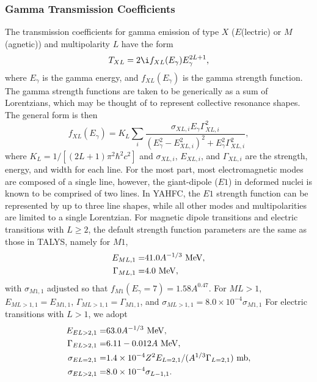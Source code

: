 \documentclass[
10pt,
showpacs,preprintnumbers,footinbib,
amsfonts,amsmath,amssymb,
aps,
prc,twocolumn,groupedaddress,superscriptaddress,
showkeys,
nofootinbib
]{revtex4-1}
\begin{document}
\subsubsection{Gamma Transmission Coefficients}

The transmission coefficients for gamma emission of type $X$ ($E$(lectric) or $M$(agnetic)) and multipolarity $L$ have the form
\begin{equation}
T_{XL} = 2\i f_{XL}(E_\gamma)E_\gamma^{2L+1},
\end{equation}
where $E_\gamma$ is the gamma energy, and $f_{XL}(E_\gamma)$ is the gamma strength function. The gamma strength functions are taken to be generically as a sum of Lorentzians, which may be thought of to represent collective resonance shapes. The general form is then
\begin{equation}
f_{XL}(E_\gamma ) = K_L \sum_i \frac{\sigma_{XL,i} E_\gamma\Gamma^2_{XL,i}}{(E_\gamma^2 - E^2_{XL,i})^2+E^2_\gamma\Gamma^2_{XL,i}},
\label{eq:Lor}
\end{equation} 
where $K_L = 1/[(2L+1)\pi^2\hbar^2c^2]$ and $\sigma_{XL,i}$, $E_{XL,i}$, and $\Gamma_{XL,i}$ are the strength, energy, and width for each line. For the most part, most electromagnetic modes are composed of a single line, however, the giant-dipole ($E1$) in deformed nuclei is known to be comprised of two lines. In YAHFC, the $E1$ strength function can be represented by up to three line shapes, while all other modes and multipolarities are limited to a single Lorentzian. For magnetic dipole transitions and electric transitions with $L \ge 2$, the default strength function parameters are the same as those in TALYS, namely for $M1$,
\begin{align}
E_{ML,1} =  & 41.0A^{-1/3}~{\rm MeV},\notag\\
\Gamma_{ML,1} = & 4.0~{\rm MeV},
\end{align}
with $\sigma_{M1,1}$ adjusted so that $f_{M1}(E_\gamma = 7) = 1.58A^{0.47}$. For $ML>1$, $E_{ML>1,1} = E_{M1,1}$, $\Gamma_{ML>1,1} = \Gamma_{M1,1}$, and $\sigma_{ML>1,1} = 8.0\times 10^{-4}\sigma_{M1,1}$
 For electric transitions with $L > 1$, we adopt
\begin{align}
E_{EL>2,1} =  & 63.0A^{-1/3}~{\rm MeV},\notag\\
\Gamma_{EL>2,1} = & 6.11 - 0.012A~{\rm MeV},\notag\\
\sigma_{EL=2,1}= & 1.4\times 10^{-4}Z^2E_{L=2,1}/(A^{1/3}\Gamma_{L=2,1})~{\rm mb},\notag\\
\sigma_{EL>2,1}= & 8.0\times 10^{-4}\sigma_{L-1,1}.
\end{align}
\end{document}
